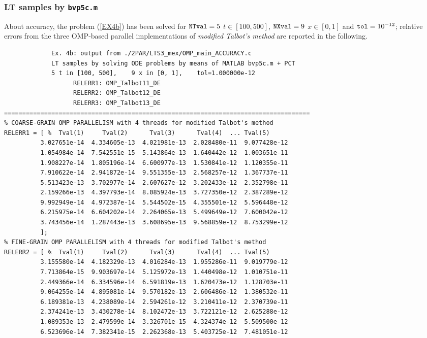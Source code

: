 \documentclass[a4paper,10pt]{report}%
\begin{document}
\newpage
\subsubsection{LT samples by {\tt bvp5c.m}}
About accuracy, the problem (\ref{EX4b}) has been solved for ${\tt NTval}=5$ $t\in[100, 500]$,
${\tt NXval}=9$ $x\in[0,1]$ and ${\tt tol}=10^{-12}$; relative errors from the three OMP-based parallel
implementations of {\em modified Talbot's method} are reported in the following.
\begin{lstlisting}
             Ex. 4b: output from ./2PAR/LTS3_mex/OMP_main_ACCURACY.c
             LT samples by solving ODE problems by means of MATLAB bvp5c.m + PCT
             5 t in [100, 500],    9 x in [0, 1],    tol=1.000000e-12
                   RELERR1: OMP_Talbot11_DE
                   RELERR2: OMP_Talbot12_DE
                   RELERR3: OMP_Talbot13_DE
====================================================================================
% COARSE-GRAIN OMP PARALLELISM with 4 threads for modified Talbot's method
RELERR1 = [ %  Tval(1)     Tval(2)      Tval(3)      Tval(4)  ... Tval(5)
          3.027651e-14  4.334605e-13  4.021981e-13  2.028480e-11  9.077428e-12
          1.054984e-14  7.542551e-15  5.143864e-13  1.640442e-12  1.003651e-11
          1.908227e-14  1.805196e-14  6.600977e-13  1.530841e-12  1.120355e-11
          7.910622e-14  2.941872e-14  9.551355e-13  2.568257e-12  1.367737e-11
          5.513423e-13  3.702977e-14  2.607627e-12  3.202433e-12  2.352798e-11
          2.159266e-13  4.397793e-14  8.085924e-13  3.727350e-12  2.387289e-12
          9.992949e-14  4.972387e-14  5.544502e-15  4.355501e-12  5.596448e-12
          6.215975e-14  6.604202e-14  2.264065e-13  5.499649e-12  7.600042e-12
          3.743456e-14  1.287443e-13  3.608695e-13  9.568859e-12  8.753299e-12
          ];
% FINE-GRAIN OMP PARALLELISM with 4 threads for modified Talbot's method
RELERR2 = [ %  Tval(1)     Tval(2)      Tval(3)      Tval(4)  ... Tval(5)
          3.155580e-14  4.182329e-13  4.016284e-13  1.955286e-11  9.019779e-12
          7.713864e-15  9.903697e-14  5.125972e-13  1.440498e-12  1.010751e-11
          2.449366e-14  6.334596e-14  6.591819e-13  1.620473e-12  1.128703e-11
          9.064255e-14  4.895081e-14  9.570182e-13  2.606486e-12  1.380532e-11
          6.189381e-13  4.238089e-14  2.594261e-12  3.210411e-12  2.370739e-11
          2.374241e-13  3.430278e-14  8.102472e-13  3.722121e-12  2.625288e-12
          1.089353e-13  2.479599e-14  3.326701e-15  4.324374e-12  5.509500e-12
          6.523696e-14  7.382341e-15  2.262368e-13  5.403725e-12  7.481051e-12

\end{lstlisting}
\end{document}
